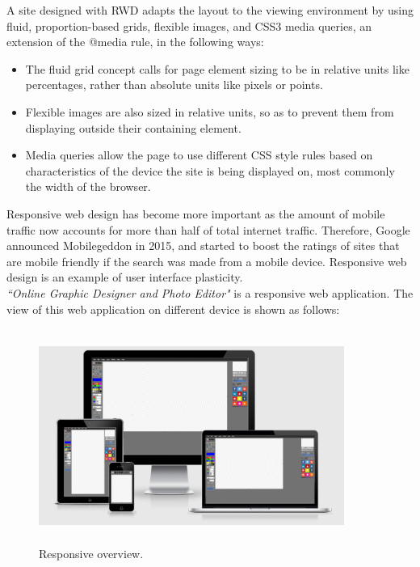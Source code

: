 \documentclass[12pt,a4 paper]{report}
\begin{document}
A site designed with RWD adapts the layout to the viewing environment by using fluid, proportion-based grids, flexible images, and CSS3 media queries, an extension of the @media rule, in the following ways:

\begin{itemize}
\item The fluid grid concept calls for page element sizing to be in relative units like percentages, rather than absolute units like pixels or points.

\item Flexible images are also sized in relative units, so as to prevent them from displaying outside their containing element.

\item Media queries allow the page to use different CSS style rules based on characteristics of the device the site is being displayed on, most commonly the width of the browser.
\end{itemize}

Responsive web design has become more important as the amount of mobile traffic now accounts for more than half of total internet traffic. Therefore, Google announced Mobilegeddon in 2015, and started to boost the ratings of sites that are mobile friendly if the search was made from a mobile device. Responsive web design is an example of user interface plasticity. \\

\textit{``Online Graphic Designer and Photo Editor"} is a responsive web application. The view of this web application on different device is shown as follows:

\begin{figure}[h]
\begin{center}
\includegraphics[width=10cm, height=7cm]{rps.png}
\caption{Responsive overview.}
\end{center}
\end{figure}
\end{document}
